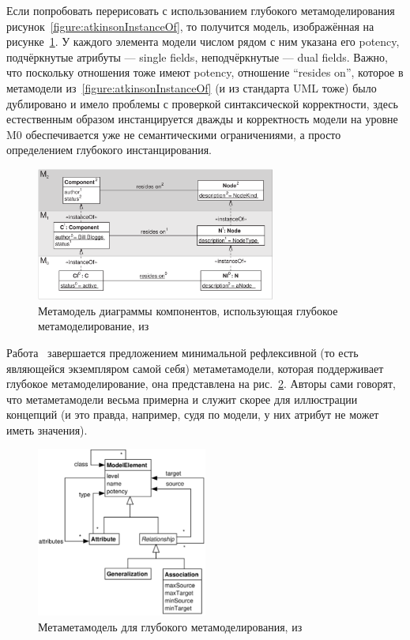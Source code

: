 \documentclass[a5paper]{article}
\begin{document}
Если попробовать перерисовать с использованием глубокого метамоделирования рисунок~\ref{figure:atkinsonInstanceOf}, то получится модель, изображённая на рисунке~\ref{figure:deepComponents}. У каждого элемента модели числом рядом с ним указана его potency, подчёркнутые атрибуты --- single fields, неподчёркнутые --- dual fields. Важно, что поскольку отношения тоже имеют potency, отношение ``resides on'', которое в метамодели из~\ref{figure:atkinsonInstanceOf} (и из стандарта UML тоже) было дублировано и имело проблемы с проверкой синтаксической корректности, здесь естественным образом инстанцируется дважды и корректность модели на уровне M0 обеспечивается уже не семантическими ограничениями, а просто определением глубокого инстанцирования.

\begin{figure}
	\begin{center}
		\includegraphics[width=0.7\textwidth]{deepComponents.png}
	\end{center}
	\caption{Метамодель диаграммы компонентов, использующая глубокое метамоделирование, из~\cite{atkinson2001multilevel}}
	\label{figure:deepComponents}
\end{figure}

Работа~\cite{atkinson2001multilevel} завершается предложением минимальной рефлексивной (то есть являющейся экземпляром самой себя) метаметамодели, которая поддерживает глубокое метамоделирование, она представлена на рис.~\ref{figure:momm}. Авторы сами говорят, что метаметамодели весьма примерна и служит скорее для иллюстрации концепций (и это правда, например, судя по модели, у них атрибут не может иметь значения). 

\begin{figure}
	\begin{center}
		\includegraphics[width=0.5\textwidth]{momm.png}
	\end{center}
	\caption{Метаметамодель для глубокого метамоделирования, из~\cite{atkinson2001multilevel}}
	\label{figure:momm}
\end{figure}
\end{document}
